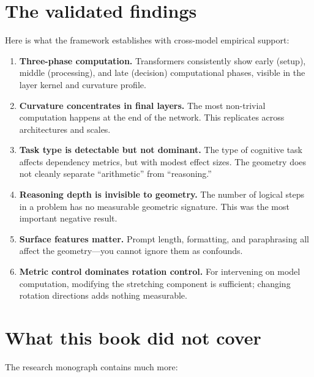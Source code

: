 \documentclass[11pt, twoside, openright]{memoir}
\begin{document}
\section{The validated findings}

Here is what the framework establishes with cross-model empirical support:

\begin{enumerate}
\item \textbf{Three-phase computation.} Transformers consistently show
  early (setup), middle (processing), and late (decision) computational
  phases, visible in the layer kernel and curvature profile.

\item \textbf{Curvature concentrates in final layers.} The most
  non-trivial computation happens at the end of the network. This
  replicates across architectures and scales.

\item \textbf{Task type is detectable but not dominant.} The type of
  cognitive task affects dependency metrics, but with modest effect
  sizes. The geometry does not cleanly separate ``arithmetic'' from
  ``reasoning.''

\item \textbf{Reasoning depth is invisible to geometry.} The number
  of logical steps in a problem has no measurable geometric signature.
  This was the most important negative result.

\item \textbf{Surface features matter.} Prompt length, formatting,
  and paraphrasing all affect the geometry---you cannot ignore them
  as confounds.

\item \textbf{Metric control dominates rotation control.} For
  intervening on model computation, modifying the stretching component
  is sufficient; changing rotation directions adds nothing measurable.
\end{enumerate}

\section{What this book did not cover}

The research monograph contains much more:
\end{document}
